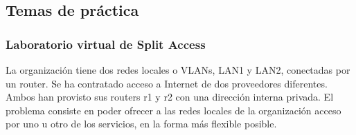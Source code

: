 \subsection{Temas de práctica}
\subsubsection{Laboratorio virtual de Split Access}
La organización tiene dos redes locales o VLANs, LAN1 y LAN2, conectadas por un router. Se ha contratado acceso a Internet de dos proveedores diferentes. Ambos han provisto sus routers r1 y r2 con una dirección interna privada. El problema consiste en poder ofrecer a las redes locales de la organización acceso por uno u otro de los servicios, en la forma más flexible posible.


